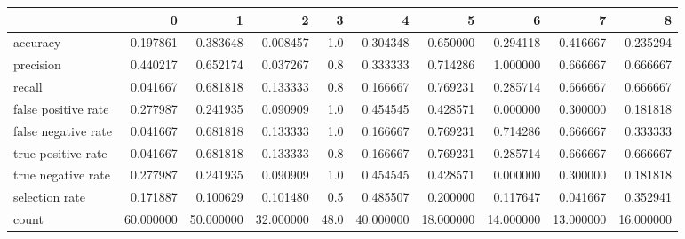 \begin{tabular}{lrrrrrrrrr}
\toprule
{} &          0 &          1 &          2 &     3 &          4 &          5 &          6 &          7 &          8 \\
\midrule
accuracy            &   0.197861 &   0.383648 &   0.008457 &   1.0 &   0.304348 &   0.650000 &   0.294118 &   0.416667 &   0.235294 \\
precision           &   0.440217 &   0.652174 &   0.037267 &   0.8 &   0.333333 &   0.714286 &   1.000000 &   0.666667 &   0.666667 \\
recall              &   0.041667 &   0.681818 &   0.133333 &   0.8 &   0.166667 &   0.769231 &   0.285714 &   0.666667 &   0.666667 \\
false positive rate &   0.277987 &   0.241935 &   0.090909 &   1.0 &   0.454545 &   0.428571 &   0.000000 &   0.300000 &   0.181818 \\
false negative rate &   0.041667 &   0.681818 &   0.133333 &   1.0 &   0.166667 &   0.769231 &   0.714286 &   0.666667 &   0.333333 \\
true positive rate  &   0.041667 &   0.681818 &   0.133333 &   0.8 &   0.166667 &   0.769231 &   0.285714 &   0.666667 &   0.666667 \\
true negative rate  &   0.277987 &   0.241935 &   0.090909 &   1.0 &   0.454545 &   0.428571 &   0.000000 &   0.300000 &   0.181818 \\
selection rate      &   0.171887 &   0.100629 &   0.101480 &   0.5 &   0.485507 &   0.200000 &   0.117647 &   0.041667 &   0.352941 \\
count               &  60.000000 &  50.000000 &  32.000000 &  48.0 &  40.000000 &  18.000000 &  14.000000 &  13.000000 &  16.000000 \\
\bottomrule
\end{tabular}
